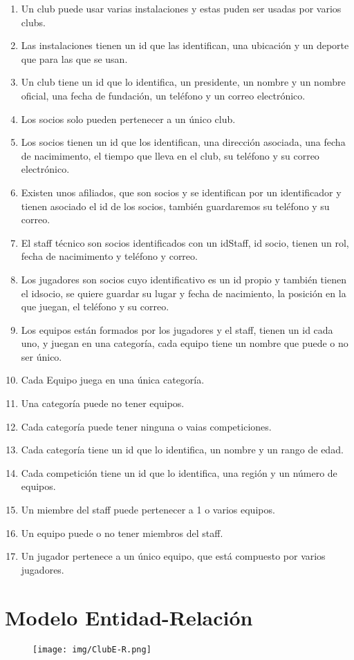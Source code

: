 \documentclass{article}
\begin{document}
      \begin{enumerate}
        
        \item Un club puede usar varias instalaciones y estas puden ser usadas por varios clubs.
        \item Las instalaciones tienen un id que las identifican, una ubicación y un deporte que para las que se usan.
        \item Un club tiene un id que lo identifica, un presidente, un nombre y un nombre oficial, una fecha de fundación, un teléfono y un correo electrónico.
        \item Los socios solo pueden pertenecer a un único club.
        \item Los socios tienen un id que los identifican, una dirección asociada, una fecha de nacimimento, el tiempo que lleva en el club, su teléfono y su correo electrónico.
        \item Existen unos afiliados, que son socios y se identifican por un identificador y tienen asociado el id de los socios, también guardaremos su teléfono y su correo.
        \item El staff técnico son socios identificados con un idStaff, id socio, tienen un rol, fecha de nacimimento y teléfono y correo.
        \item Los jugadores son socios cuyo identificativo es un id propio y también tienen el idsocio, se quiere guardar su lugar y fecha de nacimiento, la posición en la que juegan, el teléfono y su correo.
        \item Los equipos están formados por los jugadores y el staff, tienen un id cada uno, y juegan en una categoría, cada equipo tiene un nombre que puede o no ser único.
        \item Cada Equipo juega en una única categoría.
        \item Una categoría puede no tener equipos.
        \item Cada categoría puede tener ninguna o vaias competiciones.
        \item Cada categoría tiene un id que lo identifica, un nombre y un rango de edad.
        \item Cada competición tiene un id que lo identifica, una región y un número de equipos.
        \item Un miembre del staff puede pertenecer a 1 o varios equipos.
        \item Un equipo puede o no tener miembros del staff.
        \item Un jugador pertenece a un único equipo, que está compuesto por varios jugadores.
      \end{enumerate}
  \newpage    
    \section{Modelo Entidad-Relación}
      \begin{figure}[h]
        \centering
        \texttt{[image: img/ClubE-R.png]}
      \end{figure}
\end{document}
